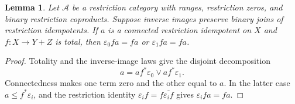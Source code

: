 \documentclass[11pt]{article}
\newtheorem{lemma}[theorem]{Lemma}
\begin{document}
\begin{lemma}\label{lem:connected-alternative}
Let $\mathcal A$ be a restriction category with ranges, restriction zeros,
and binary restriction coproducts. Suppose inverse images preserve binary
joins of restriction idempotents. If $a$ is a connected restriction
idempotent on $X$ and
$f:X\to Y+Z$ is total, then
$\varepsilon_0fa=fa$ or $\varepsilon_1fa=fa$.
\end{lemma}
\begin{proof}
Totality and the inverse-image laws give the disjoint decomposition
\[
 a=af^*\varepsilon_0\vee af^*\varepsilon_1.
\]
Connectedness makes one term zero and the other equal to $a$. In the
latter case $a\le f^*\varepsilon_i$, and the restriction identity
$\varepsilon_i f=f\overline{\varepsilon_i f}$ gives
$\varepsilon_i fa=fa$.
\end{proof}
\end{document}
